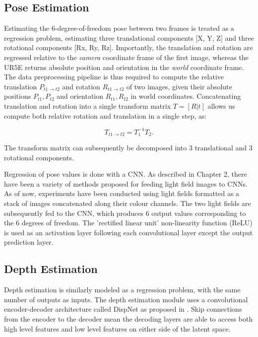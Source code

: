 \subsection{Pose Estimation}

Estimating the 6-degree-of-freedom pose between two frames is treated as a regression problem, estimating three translational components [X, Y, Z] and three rotational components [Rx, Ry, Rz]. Importantly, the translation and rotation are regressed relative to the \textit{camera} coordinate frame of the first image, whereas the UR5E returns absolute position and orientation in the \textit{world} coordinate frame. The data preprocessing pipeline is thus required to compute the relative translation $P_{t1 \rightarrow t2}$ and rotation $R_{t1 \rightarrow t2}$ of two images, given their absolute positions $P_{t1}, P_{t2}$ and orientation $R_{t1}, R_{t2}$ in world coordinates. Concatenating translation and rotation into a single transform matrix $T = [R|t]$ allows us compute both relative rotation and translation in a single step, as:

\begin{equation}
T_{t1 \rightarrow t2} = T_1^{-1} T_2.
\end{equation}

The transform matrix can subsequently be decomposed into 3 translational and 3 rotational components. 

Regression of pose values is done with a CNN. As described in Chapter 2, there have been a variety of methods proposed for feeding light field images to CNNs. As of now, experiments have been conducted using light fields formatted as a stack of images concatenated along their colour channels. The two light fields are subsequently fed to the CNN, which produces 6 output values corresponding to the 6 degrees of freedom. The 'rectified linear unit' non-linearity function (ReLU) is used as an activation layer following each convolutional layer except the output prediction layer. 


\subsection{Depth Estimation}

Depth estimation is similarly modeled as a regression problem, with the same number of outputs as inputs. The depth estimation module uses a convolutional encoder-decoder architecture called DispNet as proposed in \cite{mayer2015dispnet}. Skip connections from the encoder to the decoder mean the decoding layers are able to access both high level features and low level features on either side of the latent space.

